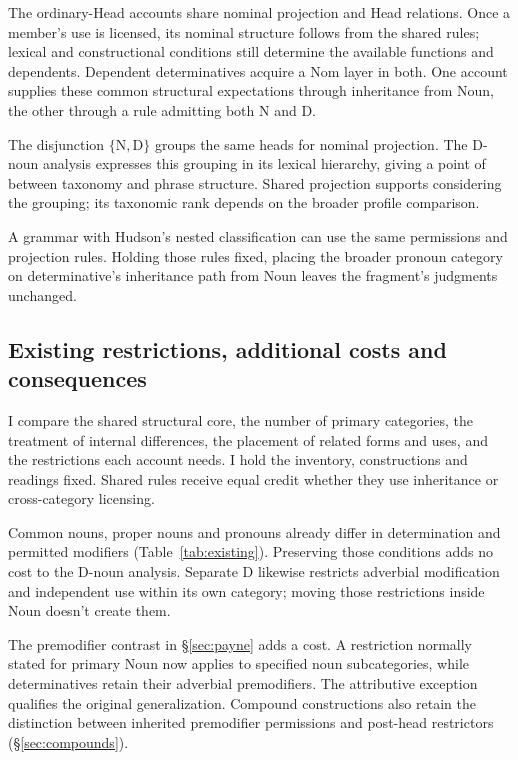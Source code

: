 \documentclass[12pt]{article}
\begin{document}
The ordinary-Head accounts share nominal projection and Head relations. Once a member's use is licensed, its nominal structure follows from the shared rules; lexical and constructional conditions still determine the available functions and dependents. Dependent determinatives acquire a Nom layer in both. One account supplies these common structural expectations through inheritance from Noun, the other through a rule admitting both N and D.

The disjunction $\{\mathrm{N},\mathrm{D}\}$ groups the same heads for nominal projection. The D-noun analysis expresses this grouping in its lexical hierarchy, giving a point of  between taxonomy and phrase structure. Shared projection supports considering the grouping; its taxonomic rank depends on the broader profile comparison.

A grammar with Hudson's nested classification can use the same permissions and projection rules. Holding those rules fixed, placing the broader pronoun category on determinative's inheritance path from Noun leaves the fragment's judgments unchanged.

\subsection{Existing restrictions, additional costs and consequences}\label{sec:costs}

I compare the shared structural core, the number of primary categories, the treatment of internal differences, the placement of related forms and uses, and the restrictions each account needs. I hold the inventory, constructions and readings fixed. Shared rules receive equal credit whether they use inheritance or cross-category licensing.

Common nouns, proper nouns and pronouns already differ in determination and permitted modifiers (Table~\ref{tab:existing}). Preserving those conditions adds no cost to the D-noun analysis. Separate D likewise restricts adverbial modification and independent use within its own category; moving those restrictions inside Noun doesn't create them.

The premodifier contrast in §\ref{sec:payne} adds a cost. A restriction normally stated for primary Noun now applies to specified noun subcategories, while determinatives retain their adverbial premodifiers. The attributive  exception qualifies the original generalization. Compound constructions also retain the distinction between inherited premodifier permissions and post-head restrictors (§\ref{sec:compounds}).
\end{document}
